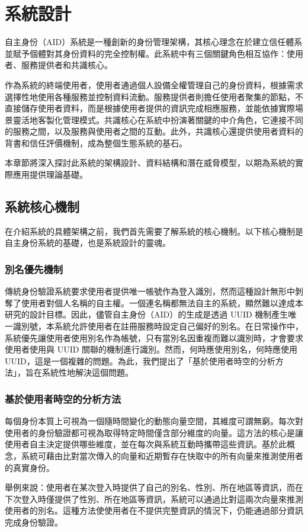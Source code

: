 
\chapter{系統設計}
自主身份（AID）系統是一種創新的身份管理架構，其核心理念在於建立信任體系並賦予個體對其身份資料的完全控制權。此系統中有三個關鍵角色相互協作：使用者、服務提供者和共識核心。

作為系統的終端使用者，使用者通過個人設備全權管理自己的身份資料，根據需求選擇性地使用各種服務並控制資料流動。服務提供者則擔任使用者聚集的節點，不直接儲存使用者資料，而是根據使用者提供的資訊完成相應服務，並能依據實際場景靈活地客製化管理模式。共識核心在系統中扮演著關鍵的中介角色，它連接不同的服務之間，以及服務與使用者之間的互動。此外，共識核心還提供使用者資料的背書和信任評價機制，成為整個生態系統的基石。

本章節將深入探討此系統的架構設計、資料結構和潛在威脅模型，以期為系統的實際應用提供理論基礎。
\section{系統核心機制}
在介紹系統的具體架構之前，我們首先需要了解系統的核心機制。以下核心機制是自主身份系統的基礎，也是系統設計的靈魂。
\subsection{別名優先機制}
傳統身份驗證系統要求使用者提供唯一帳號作為登入識別，然而這種設計無形中剝奪了使用者對個人名稱的自主權。一個連名稱都無法自主的系統，顯然難以達成本研究的設計目標。因此，儘管自主身份（AID）的生成是透過 UUID 機制\cite{uuid}產生唯一識別號，本系統允許使用者在註冊服務時設定自己偏好的別名。在日常操作中，系統優先讓使用者使用別名作為帳號，只有當別名因重複而難以識別時，才會要求使用者使用與 UUID 關聯的機制進行識別。然而，何時應使用別名，何時應使用 UUID，這是一個複雜的問題。為此，我們提出了「基於使用者時空的分析方法」，旨在系統性地解決這個問題。
\subsection{基於使用者時空的分析方法}
每個身份本質上可視為一個隨時間變化的動態向量空間，其維度可謂無窮。每次對使用者的身份驗證都可視為取得特定時間僅含部分維度的向量。這方法的核心是讓使用者自主決定提供哪些維度，並在每次與系統互動時攜帶這些資訊。基於此概念，系統可藉由比對當次傳入的向量和近期暫存在快取中的所有向量來推測使用者的真實身份。

舉例來說：使用者在某次登入時提供了自己的別名、性別、所在地區等資訊，而在下次登入時僅提供了性別、所在地區等資訊，系統可以通過比對這兩次向量來推測使用者的別名。這種方法使使用者在不提供完整資訊的情況下，仍能通過部分資訊完成身份驗證。

